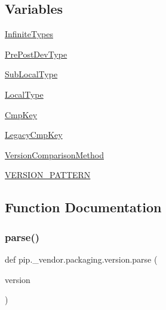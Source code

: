 \subsection*{Variables}
\begin{DoxyCompactItemize}
\item 
\hyperlink{namespacepip_1_1__vendor_1_1packaging_1_1version_a1c6fc00ed9b276784511ee1adc8b5737}{Infinite\+Types}
\item 
\hyperlink{namespacepip_1_1__vendor_1_1packaging_1_1version_ad765a3a692cf23a82f365e45b36a9cf8}{Pre\+Post\+Dev\+Type}
\item 
\hyperlink{namespacepip_1_1__vendor_1_1packaging_1_1version_ae9a4a776eb6a205d3420461e71d85edd}{Sub\+Local\+Type}
\item 
\hyperlink{namespacepip_1_1__vendor_1_1packaging_1_1version_a90f9068b43b9f81840911d51156eee8f}{Local\+Type}
\item 
\hyperlink{namespacepip_1_1__vendor_1_1packaging_1_1version_a507764ccfbe3f5d3bbf8613f4268cc22}{Cmp\+Key}
\item 
\hyperlink{namespacepip_1_1__vendor_1_1packaging_1_1version_a8ac036b644a4534261a53e062568e8f9}{Legacy\+Cmp\+Key}
\item 
\hyperlink{namespacepip_1_1__vendor_1_1packaging_1_1version_add88494efca2f03ef37253dc747bf0c7}{Version\+Comparison\+Method}
\item 
\hyperlink{namespacepip_1_1__vendor_1_1packaging_1_1version_ae1bffaab5781fcd4c5a592cd27d60932}{V\+E\+R\+S\+I\+O\+N\+\_\+\+P\+A\+T\+T\+E\+RN}
\end{DoxyCompactItemize}


\subsection{Function Documentation}
\mbox{\label{namespacepip_1_1__vendor_1_1packaging_1_1version_a2e8fa91e611195b709fdd36e1fb002b8}} 
\subsubsection{\texorpdfstring{parse()}{parse()}}
{\footnotesize\ttfamily def pip.\+\_\+vendor.\+packaging.\+version.\+parse (\begin{DoxyParamCaption}\item[{}]{version }\end{DoxyParamCaption})}



